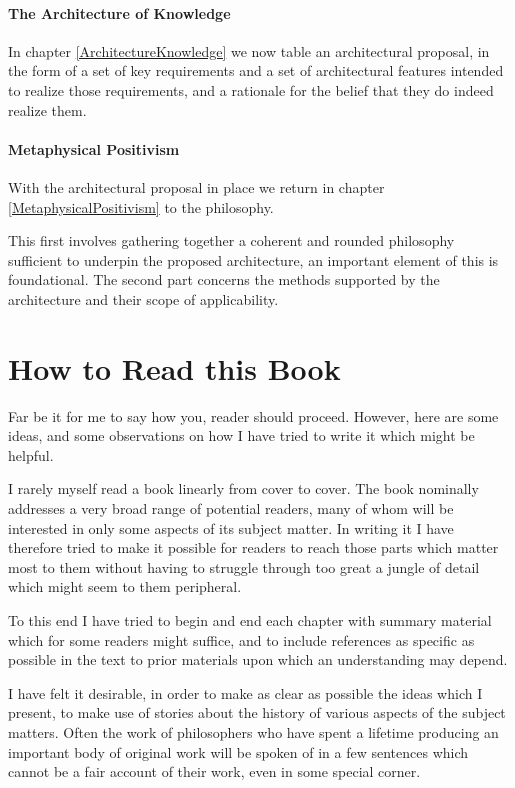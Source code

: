 \paragraph{The Architecture of Knowledge}

In chapter \ref{ArchitectureKnowledge} we now table an architectural
  proposal, in the form of a set of key requirements and a set of
  architectural features intended to realize those requirements, and a
  rationale for the belief that they do indeed realize them.

\paragraph{Metaphysical Positivism}

With the architectural proposal in place we return in chapter
\ref{MetaphysicalPositivism} to the philosophy.

This first involves gathering together a coherent and rounded
philosophy sufficient to underpin the proposed architecture, an
important element of this is foundational.
The second part concerns the methods supported by the architecture and
their scope of applicability.



\section{How to Read this Book}

Far be it for me to say how you, reader should proceed.
However, here are some ideas, and some observations on how I have
tried to write it which might be helpful.

I rarely myself read a book linearly from cover to cover.
The book nominally addresses a very broad range of potential readers,
many of whom will be interested in only some aspects of its subject
matter.
In writing it I have therefore tried to make it possible for readers
to reach those parts which matter most to them without having to
struggle through too great a jungle of detail which might seem to them
peripheral.

To this end I have tried to begin and end each chapter with summary
material which for some readers might suffice, and to include 
references as specific as possible in the text to prior materials upon
which an understanding may depend.

I have felt it desirable, in order to make as clear as possible the
ideas which I present, to make use of stories about the history of
various aspects of the subject matters.
Often the work of philosophers who have spent a lifetime producing an
important body of original work will be spoken of in a few sentences
which cannot be a fair account of their work, even in some special
corner.

